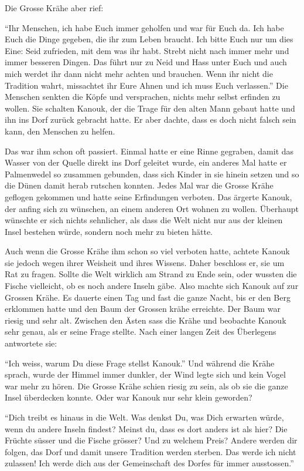 Die Grosse Krähe aber rief: 

\enquote{Ihr Menschen, ich habe Euch immer geholfen und war für Euch da. Ich habe Euch die Dinge gegeben, die ihr zum Leben braucht. Ich bitte Euch nur um dies Eine: Seid zufrieden, mit dem was ihr habt. Strebt nicht nach immer mehr und immer besseren Dingen. Das führt nur zu Neid und Hass unter Euch und auch mich werdet ihr dann nicht mehr achten und brauchen. Wenn ihr nicht die Tradition wahrt, missachtet ihr Eure Ahnen und  ich muss Euch verlassen.} Die Menschen senkten die Köpfe und versprachen, nichts mehr selbst erfinden zu wollen. Sie schalten Kanouk, der die Trage für den alten Mann gebaut hatte und ihn ins Dorf zurück gebracht hatte. Er aber dachte, dass es doch nicht falsch sein kann, den Menschen zu helfen.

Das war ihm schon oft passiert. Einmal hatte er eine Rinne gegraben, damit das Wasser von der Quelle direkt ins Dorf geleitet wurde, ein anderes Mal hatte er Palmenwedel so zusammen gebunden, dass sich Kinder in sie hinein setzen und so die Dünen damit herab rutschen konnten. Jedes Mal war die Grosse Krähe geflogen gekommen und hatte seine Erfindungen verboten. Das ärgerte Kanouk, der anfing sich zu wünschen, an einem anderen Ort wohnen zu wollen. Überhaupt wünschte er sich nichts sehnlicher, als dass die Welt nicht nur aus der kleinen Insel bestehen würde, sondern noch mehr zu bieten hätte.

Auch wenn die Grosse Krähe ihm schon so viel verboten hatte, achtete Kanouk sie jedoch wegen ihrer Weisheit und ihres Wissens. Daher beschloss er, sie um Rat zu fragen. Sollte die Welt wirklich am Strand zu Ende sein, oder wussten die Fische vielleicht, ob es noch andere Inseln gäbe. Also machte sich Kanouk auf zur Grossen Krähe. Es dauerte einen Tag und fast die ganze Nacht, bis er den Berg erklommen hatte und den Baum der Grossen krähe erreichte. Der Baum war riesig und sehr alt. Zwischen den Ästen sass die Krähe und beobachte Kanouk sehr genau, als er seine Frage stellte. Nach einer langen Zeit des Überlegens antwortete sie:

\enquote{Ich weiss, warum Du diese Frage stellst Kanouk.} Und während die Krähe sprach, wurde der Himmel immer dunkler, der Wind legte sich und kein Vogel war mehr zu hören. Die Grosse Krähe schien riesig zu sein, als ob sie die ganze Insel überdecken konnte. Oder war Kanouk nur sehr klein geworden? 

\enquote{Dich treibt es hinaus in die Welt. Was denkst Du, was Dich erwarten würde, wenn du andere Inseln findest? Meinst du, dass es dort anders ist als hier? Die Früchte süsser und die Fische grösser? Und zu welchem Preis? Andere werden dir folgen, das Dorf und damit unsere Tradition werden sterben. Das werde ich nicht zulassen! Ich werde dich aus der Gemeinschaft des Dorfes für immer ausstossen.} 

